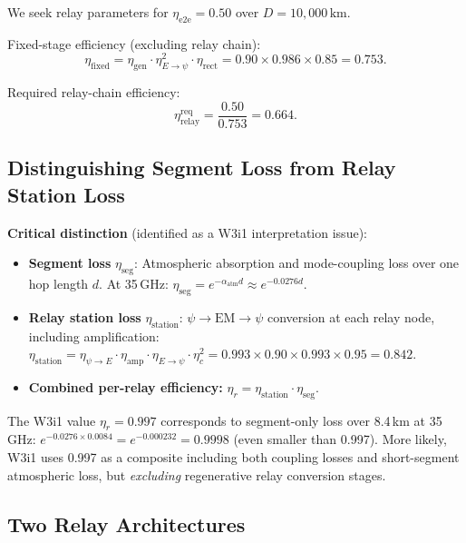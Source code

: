 \documentclass[aps,prd,twocolumn,superscriptaddress]{revtex4-2}
\begin{document}
We seek relay parameters for $\eta_\mathrm{e2e} = 0.50$ over
$D = 10{,}000\,\mathrm{km}$.

Fixed-stage efficiency (excluding relay chain):
\begin{equation}
\eta_\mathrm{fixed} = \eta_\mathrm{gen}\cdot\eta_{E\to\psi}^2\cdot\eta_\mathrm{rect}
= 0.90\times0.986\times0.85 = 0.753.
\end{equation}

Required relay-chain efficiency:
\begin{equation}
\eta_\mathrm{relay}^\mathrm{req} = \frac{0.50}{0.753} = 0.664.
\end{equation}

\subsection{Distinguishing Segment Loss from Relay Station Loss}

\textbf{Critical distinction} (identified as a W3i1 interpretation issue):

\begin{itemize}
\item \textbf{Segment loss} $\eta_\mathrm{seg}$: Atmospheric absorption
and mode-coupling loss over one hop length $d$.
At 35\,GHz: $\eta_\mathrm{seg} = e^{-\alpha_\mathrm{atm}d} \approx e^{-0.0276d}$.

\item \textbf{Relay station loss} $\eta_\mathrm{station}$: $\psi\to\mathrm{EM}\to\psi$
conversion at each relay node, including amplification:
$\eta_\mathrm{station} = \eta_{\psi\to E}\cdot\eta_\mathrm{amp}\cdot\eta_{E\to\psi}
\cdot\eta_c^2 = 0.993\times0.90\times0.993\times0.95 = 0.842$.

\item \textbf{Combined per-relay efficiency:}
$\eta_r = \eta_\mathrm{station}\cdot\eta_\mathrm{seg}$.
\end{itemize}

The W3i1 value $\eta_r = 0.997$ corresponds to segment-only loss
over 8.4\,km at 35\,GHz: $e^{-0.0276\times0.0084} = e^{-0.000232} = 0.9998$
(even smaller than 0.997).  More likely, W3i1 uses 0.997 as a composite
including both coupling losses and short-segment atmospheric loss,
but \emph{excluding} regenerative relay conversion stages.

\subsection{Two Relay Architectures}
\end{document}
